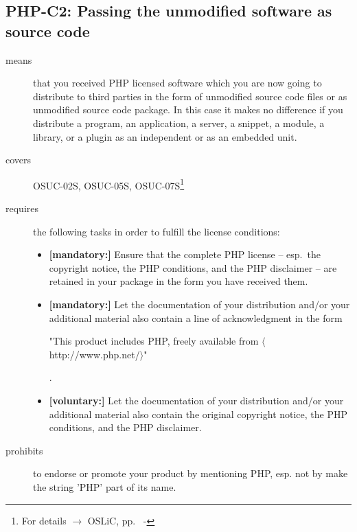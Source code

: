 \subsection{PHP-C2: Passing the unmodified software as source code}
\label{OSUC-02S-PHP} \label{OSUC-05S-PHP} \label{OSUC-07S-PHP} 

\begin{description}
\item[means] that you received PHP licensed software which you are now
  going to distribute to third parties in the form of unmodified source code
  files or as unmodified source code package. In this case it makes no
  difference if you distribute a program, an application, a server, a snippet, a
  module, a library, or a plugin as an independent or as an embedded unit.

\item[covers] OSUC-02S, OSUC-05S, OSUC-07S\footnote{For details $\rightarrow$
OSLiC, pp.\ \pageref{OSUC-02S-DEF} - \pageref{OSUC-07S-DEF}}

\item[requires] the following tasks in order to fulfill the license conditions:
\begin{itemize}
  
  \item \textbf{[mandatory:]} Ensure that the complete PHP license -- esp.\
  the copyright notice, the PHP conditions, and the PHP disclaimer -- are
  retained in your package in the form you have received them.
  
  \item \textbf{[mandatory:]} Let the documentation of your distribution and/or
  your additional material also contain a line of acknowledgment in the form
  \begin{footnotesize}"This product includes PHP, freely available from
  $\langle$http://www.php.net/$\rangle$"\end{footnotesize}.
  
  \item \textbf{[voluntary:]} Let the documentation of your distribution and/or
  your additional material also contain the original copyright notice, the PHP
  conditions, and the PHP disclaimer.
  
\end{itemize}

\item[prohibits] to endorse or promote your product by mentioning PHP, esp. not
by make the string 'PHP' part of its name.

\end{description}

